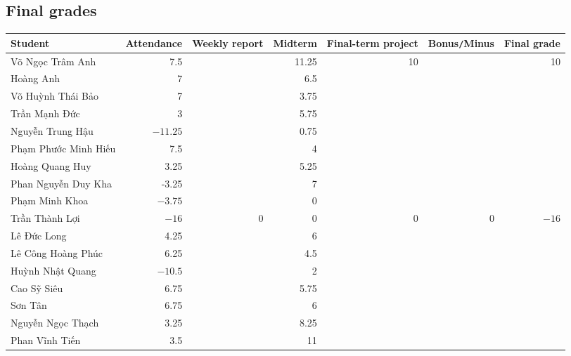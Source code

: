 \documentclass{article}
\begin{document}

\subsection{Final grades}

\begin{table}[H]
    \centering
    \begin{tabular}{|l|r|r|r|r|r|r|}
        \hline
        Student & Attendance & Weekly report & Midterm & Final-term project & Bonus{\tt/}Minus & Final grade \\
        \hline
        {\sc Võ Ngọc Trâm Anh} & 7.5 &  & 11.25 & 10 &  &  10 \\
        \hline
        {\sc Hoàng Anh} & 7 &  & 6.5 &  &  &  \\
        \hline
        {\sc Võ Huỳnh Thái Bảo} & 7 &  & 3.75 &  &  &  \\
        \hline
        {\sc Trần Mạnh Đức} & 3 &  & 5.75 &  &  &  \\
        \hline
        {\sc Nguyễn Trung Hậu} & $-11.25$ &  & 0.75 &  &  &  \\
        \hline
        {\sc Phạm Phước Minh Hiếu} & 7.5 &  & 4 &  &  &  \\
        \hline
        {\sc Hoàng Quang Huy} & 3.25 &  & 5.25 &  &  &  \\
        \hline
        {\sc Phan Nguyễn Duy Kha} & -3.25 &  & 7 &  &  &  \\
        \hline
        {\sc Phạm Minh Khoa} & $-3.75$ &  & 0 &  &  &  \\
        \hline
        {\sc Trần Thành Lợi} & $-16$ & 0 & 0 & 0 & 0 & $-16$ \\
        \hline
        {\sc Lê Đức Long} & 4.25 &  & 6 &  &  &  \\
        \hline
        {\sc Lê Công Hoàng Phúc} & 6.25 & & 4.5 &  &  &  \\
        \hline
        {\sc Huỳnh Nhật Quang} & $-10.5$ &  & 2 &  &  &  \\
        \hline
        {\sc Cao Sỹ Siêu} & 6.75 &  & 5.75 &  &  &  \\
        \hline
        {\sc Sơn Tân} & 6.75 &  & 6 &  &  &  \\
        \hline
        {\sc Nguyễn Ngọc Thạch} & 3.25 &  & 8.25 &  &  &  \\
        \hline
        {\sc Phan Vĩnh Tiến} & 3.5 &  & 11 &  &  &  \\
        \hline
    \end{tabular}
\end{table}

\end{document}
